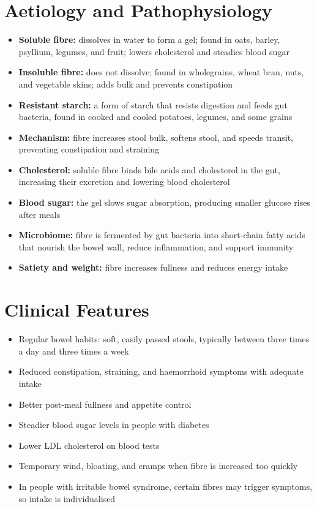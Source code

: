 \section*{Aetiology and Pathophysiology}
\begin{itemize}
    \item \textbf{Soluble fibre:} dissolves in water to form a gel; found in oats, barley, psyllium, legumes, and fruit; lowers cholesterol and steadies blood sugar
    \item \textbf{Insoluble fibre:} does not dissolve; found in wholegrains, wheat bran, nuts, and vegetable skins; adds bulk and prevents constipation
    \item \textbf{Resistant starch:} a form of starch that resists digestion and feeds gut bacteria, found in cooked and cooled potatoes, legumes, and some grains
    \item \textbf{Mechanism:} fibre increases stool bulk, softens stool, and speeds transit, preventing constipation and straining
    \item \textbf{Cholesterol:} soluble fibre binds bile acids and cholesterol in the gut, increasing their excretion and lowering blood cholesterol
    \item \textbf{Blood sugar:} the gel slows sugar absorption, producing smaller glucose rises after meals
    \item \textbf{Microbiome:} fibre is fermented by gut bacteria into short-chain fatty acids that nourish the bowel wall, reduce inflammation, and support immunity
    \item \textbf{Satiety and weight:} fibre increases fullness and reduces energy intake
\end{itemize}

\section*{Clinical Features}
\begin{itemize}
    \item Regular bowel habits: soft, easily passed stools, typically between three times a day and three times a week
    \item Reduced constipation, straining, and haemorrhoid symptoms with adequate intake
    \item Better post-meal fullness and appetite control
    \item Steadier blood sugar levels in people with diabetes
    \item Lower LDL cholesterol on blood tests
    \item Temporary wind, bloating, and cramps when fibre is increased too quickly
    \item In people with irritable bowel syndrome, certain fibres may trigger symptoms, so intake is individualised
\end{itemize}

